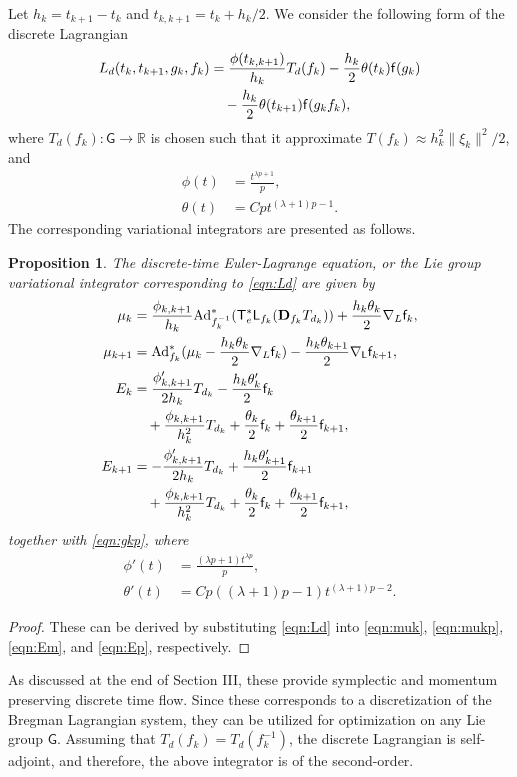 \documentclass[letterpaper, 10pt, conference]{ieeeconf}
\newcommand{\G}{\ensuremath{\mathsf{G}}}
\newcommand{\T}{\ensuremath{\mathsf{T}}}
\renewcommand{\L}{\ensuremath{\mathsf{L}}}
\renewcommand{\Re}{\ensuremath{\mathbb{R}}}
\newcommand{\D}{\ensuremath{\mathbf{D}}}
\newcommand{\Ad}{\ensuremath{\mathrm{Ad}}}
\newtheorem{prop}{Proposition}
\begin{document}
Let $h_k = t_{k+1}- t_k$ and $t_{k,k+1} = t_k + h_k/2$.  
We consider the following form of the discrete Lagrangian
\begin{align}
    L_d(t_k, t_{k+1}, g_k, f_k ) & = \frac{\phi(t_{k,k+1}) }{h_k} T_d(f_k) -\frac{h_k}{2} \theta(t_k) \mathsf{f} (g_k)\nonumber \\
                                 & \quad -\frac{h_k}{2} \theta(t_{k+1}) \mathsf{f} (g_kf_k), \label{eqn:Ld}
\end{align}
where $T_d(f_k):\G\rightarrow\Re$ is chosen such that it approximate $T(f_k) \approx h_k^2 \|\xi_k \|^2/2$, and
\begin{align}
    \phi(t) & = \frac{t^{\lambda p +1}}{p},\\
    \theta(t) & = C p t^{(\lambda+1)p-1}.
\end{align}
The corresponding variational integrators are presented as follows. 
\begin{prop}\label{prop:DEL_Breg}
    The discrete-time Euler-Lagrange equation, or the Lie group variational integrator corresponding to \eqref{eqn:Ld} are given by
\begin{align}
    \mu_k & =  \frac{\phi_{k,k+1}}{h_k}\Ad^*_{f_k^{-1}} (\T^*_e\L_{f_k}(\D_{f_k} T_{d_k})) + \frac{h_k\theta_k}{2} \nabla_L \obj_k, \label{eqn:muk_Breg}\\
    \mu_{k+1} & = \Ad^*_{f_k}( \mu_k - \frac{h_k\theta_k}{2} \nabla_L\obj_k ) -\frac{h_k\theta_{k+1}}{2} \nabla_\L \obj_{k+1}, \label{eqn:mukp_Breg}\\
    E_{k} & = \frac{\phi'_{k,k+1}}{ 2 h_k} T_{d_k} -\frac{h_k\theta'_{k}}{2} \obj_{k} \nonumber\\\
          & \quad + \frac{\phi_{k,k+1}}{h_k^2}T_{d_k} + \frac{\theta_k}{2}\obj_k + \frac{\theta_{k+1}}{2}\obj_{k+1}, \label{eqn:Ek_Breg}\\
    E_{k+1} & = -\frac{\phi'_{k,k+1}}{ 2 h_k} T_{d_k} +\frac{h_k\theta'_{k+1}}{2} \obj_{k+1}\nonumber \\\
            & \quad + \frac{\phi_{k,k+1}}{h_k^2}T_{d_k} +\frac{\theta_k}{2}\obj_k + \frac{\theta_{k+1}}{2}\obj_{k+1}, \label{eqn:Ekp_Breg}
\end{align}
together with \eqref{eqn:gkp}, where
\begin{align*}
    \phi'(t) & = \frac{(\lambda p +1) t^{\lambda p}}{p}, \\
    \theta'(t) &  = Cp((\lambda+1)p-1) t^{(\lambda +1)p-2}.
\end{align*}
\end{prop}
\begin{proof}
    These can be derived by substituting \eqref{eqn:Ld} into \eqref{eqn:muk}, \eqref{eqn:mukp}, \eqref{eqn:Em}, and \eqref{eqn:Ep}, respectively. 
\end{proof}
As discussed at the end of Section III, these provide symplectic and momentum preserving discrete time flow.
Since these corresponds to a discretization of the Bregman Lagrangian system, they can be utilized for optimization on any Lie group $\G$. 
Assuming that $T_d(f_k)=T_d(f_k^{-1})$, the discrete Lagrangian is self-adjoint, and therefore, the above integrator is of the second-order.
\end{document}
